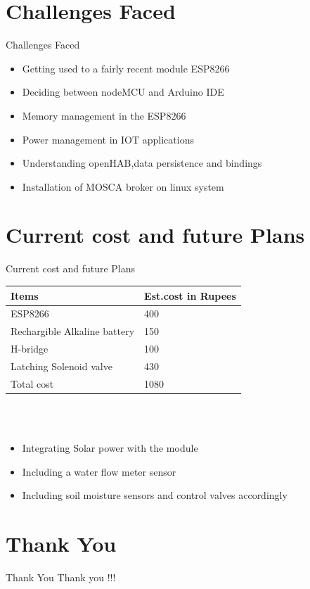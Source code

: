 \documentclass[10pt, a4paper]{beamer}
\begin{document}
\section{Challenges Faced}
\begin{frame}{Challenges Faced}
	\begin{itemize}
		\item Getting used to a fairly recent module ESP8266
		\item Deciding between nodeMCU and Arduino IDE
		\item Memory management in the ESP8266
		\item Power management in IOT applications
		\item Understanding openHAB,data persistence and bindings 
		\item Installation of MOSCA broker on linux system
	\end{itemize}
\end{frame}

\section{Current cost and future Plans}
\begin{frame}{Current cost and future Plans}
\begin{tabular}{|m{6cm}|m{3cm}|}
	\hline
	{\bf Items} & {\bf Est.cost in Rupees}\\ \hline
	ESP8266 & 400 \\ \hline
	Rechargible Alkaline battery & 150 \\ \hline
	H-bridge & 100 \\ \hline 
	Latching Solenoid valve & 430 \\ \hline
	Total cost & 1080 \\ \hline 
\end{tabular} 
\vspace{1cm}\\
 \\
	\begin{itemize}
		\item Integrating Solar power with the module
		\item Including a water flow meter sensor
		\item Including soil moisture sensors and control valves accordingly
	\end{itemize}
\end{frame}


\section{Thank You}
\begin{frame}{Thank You}
	\hspace{4cm} Thank you !!!
\end{frame}
\end{document}
